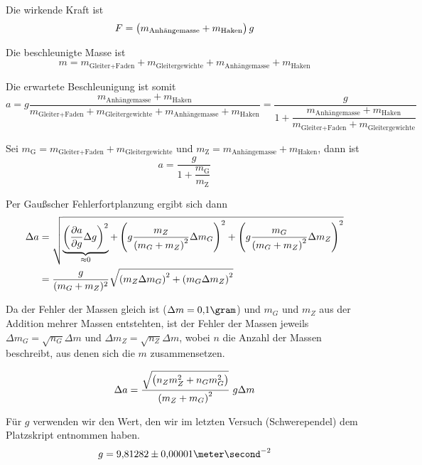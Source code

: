 \documentclass[a4paper,german,12pt,smallheadings]{scrartcl}
\begin{document}
Die wirkende Kraft ist
\begin{equation}
  F = \del{m_\text{Anhängemasse} + m_\text{Haken}} g
\end{equation}

Die beschleunigte Masse ist
\begin{equation}
  m = m_\text{Gleiter+Faden} + m_\text{Gleitergewichte} + m_\text{Anhängemasse} + m_\text{Haken}
\end{equation}

Die erwartete Beschleunigung ist somit
\begin{equation}
  a = g \frac{m_\text{Anhängemasse} + m_\text{Haken}}{m_\text{Gleiter+Faden} + m_\text{Gleitergewichte} + m_\text{Anhängemasse} + m_\text{Haken}} =
  \frac{g}{1 + \dfrac{m_\text{Anhängemasse} + m_\text{Haken}}{{m_\text{Gleiter+Faden} + m_\text{Gleitergewichte}}}}
\end{equation}

Sei $m_\text{G} = m_\text{Gleiter+Faden} + m_\text{Gleitergewichte}$ und $m_\text{Z} = m_\text{Anhängemasse} + m_\text{Haken}$, dann ist
\begin{equation}
  a = \frac{g}{1 + \dfrac{m_\text{G}}{m_\text{Z}}}
\end{equation}

Per Gaußscher Fehlerfortplanzung ergibt sich dann
\begin{align}
  \Delta a &= \sqrt{
    \underbrace{\del{\frac{\partial a}{\partial g} \Delta g}^2}_{\approx 0} +
    \del{
      g \frac{m_Z}{\del{m_G + m_Z}^2} \Delta m_G
    }^2
    +
    \del{
      g \frac{m_G}{\del{m_G + m_Z}^2} \Delta m_Z
    }^2
  } \\
  &= \frac{g}{(m_G + m_Z)^2} \sqrt{\del{m_Z \Delta m_G}^2 + \del{m_G \Delta m_Z}^2}
\end{align}

Da der Fehler der Massen gleich ist ($\Delta m = 0{,}1 \gram$) und $m_G$ und
$m_Z$ aus der Addition mehrer Massen entstehten, ist der Fehler der Massen
jeweils $\Delta m_G = \sqrt{n_G} \Delta m$ und $\Delta m_Z = \sqrt{n_Z} \Delta
m$, wobei $n$ die Anzahl der Massen beschreibt, aus denen sich die $m$
zusammensetzen.

\begin{equation}
  \Delta a = \frac{\sqrt{\del{n_Z m_Z^2 + n_G m_G^2}}}{\del{m_Z + m_G}^2} \; g \Delta m
\end{equation}

Für $g$ verwenden wir den Wert, den wir im letzten Versuch (Schwerependel) dem
Platzskript entnommen haben.
\begin{equation}
  g = 9{,}81282\pm0{,}00001 \meter\second^{-2}
\end{equation}
\end{document}
